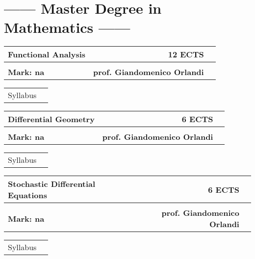 \documentclass[10pt]{article}
\begin{document}
\frenchspacing

\section*{------ Master Degree in Mathematics ------}
\begin{tabularx}{\textwidth}{p{13cm}rp{5cm}}
	\textbf{\Large Functional Analysis} & \textbf{\large 12 ECTS}\\ \hline\\
	\textbf{\large Mark: na} & \textbf{prof. Giandomenico Orlandi}\\
\end{tabularx}
\begin{tabularx}{\textwidth}{lX}
	Syllabus & \lipsum[1]\\
\end{tabularx}

\bigskip

\begin{tabularx}{\textwidth}{p{13cm}rp{5cm}}
	\textbf{\Large Differential Geometry} & \textbf{\large 6 ECTS}\\ \hline\\
	\textbf{\large Mark: na} & \textbf{prof. Giandomenico Orlandi}\\
\end{tabularx}
\begin{tabularx}{\textwidth}{lX}
	Syllabus & \lipsum[1]\\
\end{tabularx}

\bigskip

\begin{tabularx}{\textwidth}{p{13cm}rp{5cm}}
	\textbf{\Large Stochastic Differential Equations} & \textbf{\large 6 ECTS}\\ \hline\\
	\textbf{\large Mark: na} & \textbf{prof. Giandomenico Orlandi}\\
\end{tabularx}
\begin{tabularx}{\textwidth}{lX}
	Syllabus & \lipsum[1]\\
\end{tabularx}

\bigskip
\end{document}
